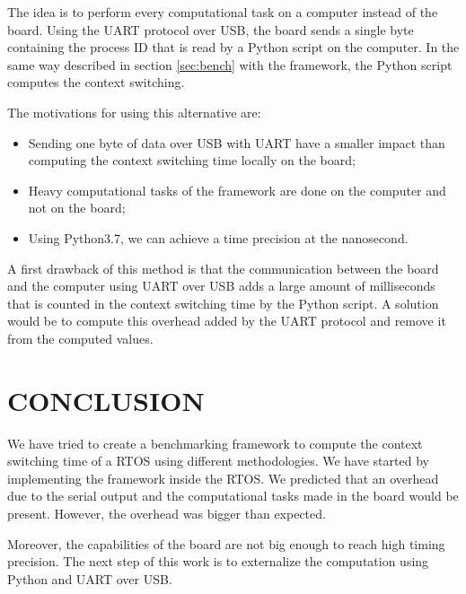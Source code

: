 \documentclass[a4paper, 10pt, conference]{ieeeconf}      %
\begin{document}
The idea is to perform every computational task on a computer instead of the board.
Using the UART protocol over USB, the board sends a single byte containing the process ID that is read by a Python script on the computer.
In the same way described in section \ref{sec:bench} with the framework, the Python script computes the context switching.

The motivations for using this alternative are:
\begin{itemize}
    \item Sending one byte of data over USB with UART have a smaller impact than computing the context switching time locally on the board;
    \item Heavy computational tasks of the framework are done on the computer and not on the board;
    \item Using Python3.7, we can achieve a time precision at the nanosecond.
\end{itemize}

A first drawback of this method is that the communication between the board and the computer using UART over USB adds a large amount of milliseconds that is counted in the context switching time by the Python script.
A solution would be to compute this overhead added by the UART protocol and remove it from the computed values.

\section{CONCLUSION}
We have tried to create a benchmarking framework to compute the context switching time of a RTOS using different methodologies.
We have started by implementing the framework inside the RTOS.
We predicted that an overhead due to the serial output and the computational tasks made in the board would be present.
However, the overhead was bigger than expected.

Moreover, the capabilities of the board are not big enough to reach high timing precision.
The next step of this work is to externalize the computation using Python and UART over USB.

\addtolength{\textheight}{-12cm}   %









\end{document}
